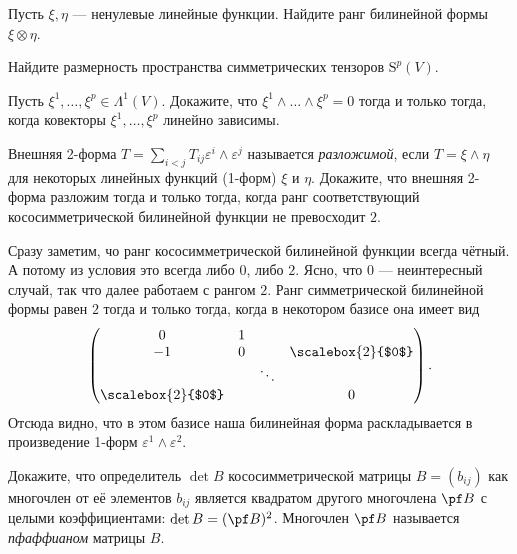 \begin{problem}
    Пусть $\xi, \eta$ --- ненулевые линейные функции. Найдите ранг билинейной формы $\xi \otimes \eta$.
\end{problem}

\begin{problem}
    Найдите размерность пространства симметрических тензоров $\mathrm{S}^p(V)$.
\end{problem}

\begin{problem}
    Пусть $\xi^1, \ldots, \xi^p \in \Lambda^1(V)$. Докажите, что $\xi^1 \wedge \ldots \wedge \xi^p = 0$ тогда и только тогда, когда ковекторы $\xi^1, \ldots, \xi^p$ линейно зависимы.
\end{problem}

\begin{solution}
\end{solution}

\begin{problem}
    Внешняя 2-форма $T = \sum\limits_{i < j}T_{ij}\varepsilon^i \wedge \varepsilon^j$ называется \textit{разложимой}, если $T = \xi \wedge \eta$ для некоторых линейных функций (1-форм) $\xi$ и $\eta$. Докажите, что внешняя 2-форма разложим тогда и только тогда, когда ранг соответствующий кососимметрической билинейной функции не превосходит $2$.
\end{problem}

\begin{solution}
    Сразу заметим, чо ранг кососимметрической билинейной функции всегда чётный. А потому из условия это всегда либо $0$, либо $2$. Ясно, что $0$ --- неинтересный случай, так что далее работаем с рангом $2$. Ранг симметрической билинейной формы равен $2$ тогда и только тогда, когда в некотором базисе она имеет вид
    \[
        \begin{pmatrix}
            0 & 1 & & \\
            -1 & 0 & & \scalebox{2}{$0$} \\
             & & \ddots & \\
             \scalebox{2}{$0$} & & & 0
        \end{pmatrix}.
    \]
    Отсюда видно, что в этом базисе наша билинейная форма раскладывается в произведение 1-форм $\varepsilon^1 \wedge \varepsilon^2$.
\end{solution}

\begin{problem}
    Докажите, что определитель $\det B$ кососимметрической матрицы $B = (b_{ij})$ как многочлен от её элементов $b_{ij}$ является квадратом другого многочлена $\pf B$ с целыми коэффициентами: $\det B = (\pf B)^2$. Многочлен $\pf B$ называется \textit{пфаффианом} матрицы $B$.
\end{problem}

